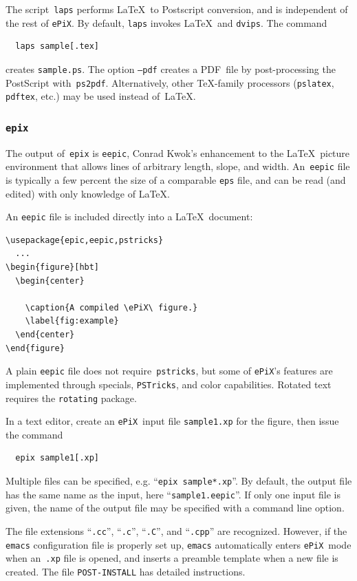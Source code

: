 \documentclass[12pt]{report}
\newcommand{\code}[1]{\texttt{#1}}
\newcommand{\filename}[1]{\texttt{#1}}
\newcommand{\ePiX}{\code{ePiX}}
\begin{document}
The script~\code{laps} performs \LaTeX\ to Postscript conversion, and
is independent of the rest of \ePiX. By default, \code{laps} invokes
\LaTeX~and \code{dvips}. The command
\begin{verbatim}
  laps sample[.tex]
\end{verbatim}
creates \filename{sample.ps}. The option \code{--pdf} creates a
PDF~file by post-processing the PostScript with~\code{ps2pdf}.
Alternatively, other \TeX-family processors (\code{pslatex},
\code{pdftex}, etc.) may be used instead of~\LaTeX.


\subsubsection*{\code{epix}}

The output of~\code{epix} is \filename{eepic}, Conrad Kwok's
enhancement to the \LaTeX\ picture environment that allows lines of
arbitrary length, slope, and width. An~\filename{eepic} file is
typically a few percent the size of a comparable \filename{eps} file,
and can be read (and edited) with only knowledge of \LaTeX.

An \filename{eepic} file is included directly into a \LaTeX\ document:
\begin{verbatim}
\usepackage{epic,eepic,pstricks}
  ...
\begin{figure}[hbt]
  \begin{center}
    
    \caption{A compiled \ePiX\ figure.}
    \label{fig:example}
  \end{center}
\end{figure}
\end{verbatim}
A plain \filename{eepic} file does not require~\code{pstricks}, but
some of \ePiX's features are implemented through specials,
\code{PSTricks}, and color capabilities. Rotated text requires the
\code{rotating} package.

In a text editor, create an \ePiX\ input file \filename{sample1.xp}
for the figure, then issue the command
\begin{verbatim}
  epix sample1[.xp]
\end{verbatim}
Multiple files can be specified, e.g. ``\code{epix sample*.xp}''.  By
default, the output file has the same name as the input, here
``\filename{sample1.eepic}''. If only one input file is given, the
name of the output file may be specified with a command line option.

The file extensions ``\filename{.cc}'', ``\filename{.c}'',
``\filename{.C}'', and ``\filename{.cpp}'' are recognized. However, if
the \code{emacs} configuration file is properly set up, \code{emacs}
automatically enters \ePiX\ mode when an~\filename{.xp} file is
opened, and inserts a preamble template when a new file is created.
The file \filename{POST-INSTALL} has detailed instructions.
\end{document}
